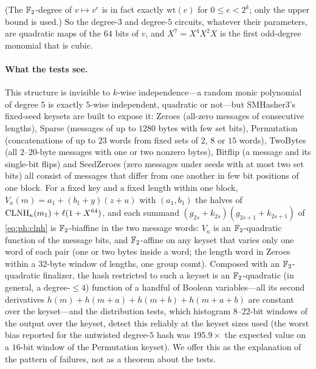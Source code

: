 (The $\mathbb{F}_2$-degree of $v\mapsto v^e$ is in fact exactly $\mathrm{wt}(e)$ for
$0\le e<2^k$; only the upper bound is used.)  So the degree-$3$ and
degree-$5$ circuits, whatever their parameters, are quadratic maps of the
$64$ bits of $v$, and $X^7=X^4X^2X$ is the first odd-degree monomial that is
cubic.

\paragraph{What the tests see.}
This structure is invisible to $k$-wise independence---a random monic
polynomial of degree $5$ is exactly $5$-wise independent, quadratic or
not---but SMHasher3's fixed-seed keysets are built to expose it: Zeroes
(all-zero messages of consecutive lengths), Sparse (messages of up to $1280$ bytes with few
set bits), Permutation (concatenations of up to $23$ words from fixed sets of $2$, $8$ or $15$ words), TwoBytes (all $2$--$20$-byte messages with one or two nonzero
bytes), Bitflip (a message and its single-bit flips) and SeedZeroes (zero
messages under seeds with at most two set bits) all consist of messages
that differ from one another in few bit positions of one block.  For a fixed
key and a fixed length within one block, $V_\kappa(m)=a_1+(b_1+y)(z+u)$ with
$(a_1,b_1)$ the halves of $\mathrm{CLNH}_{\kappa}(m_1)+\ell(1+X^{64})$, and each summand
$(g_{2s}+k_{2s})(g_{2s+1}+k_{2s+1})$ of \eqref{eq:ph:clnh} is $\mathbb{F}_2$-biaffine
in the two message words: $V_\kappa$ is an $\mathbb{F}_2$-quadratic function of the
message bits, and $\mathbb{F}_2$-affine on any keyset that varies only one word of
each pair (one or two bytes inside a word; the length word in Zeroes within
a $32$-byte window of lengths, one group count).  Composed with an $\mathbb{F}_2$-quadratic finalizer,
the hash restricted to such a keyset is an $\mathbb{F}_2$-quadratic (in general, a
degree-$\le4$) function of a handful of Boolean variables---all its second
derivatives $h(m)+h(m+a)+h(m+b)+h(m+a+b)$ are constant over the keyset---and
the distribution tests, which histogram $8$--$22$-bit windows of the output
over the keyset, detect this reliably at the keyset sizes used (the worst
bias reported for the untwisted degree-$5$ hash was $195.9\times$ the
expected value on a $16$-bit window of the Permutation keyset).  We offer
this as the explanation of the pattern of failures, not as a theorem about
the tests.

